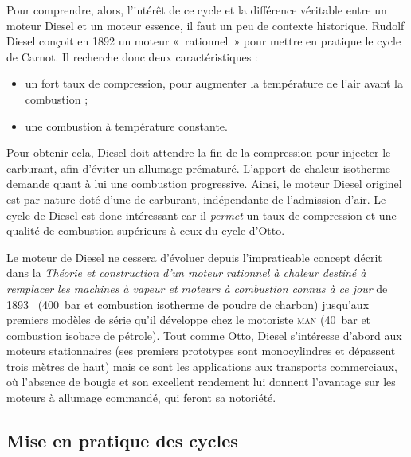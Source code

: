 		Pour comprendre, alors, l’intérêt de ce cycle et la différence véritable entre un moteur Diesel et un moteur essence, il faut un peu de contexte historique. Rudolf Diesel conçoit en 1892 un moteur «~rationnel~» pour mettre en pratique le cycle de Carnot. Il recherche donc deux caractéristiques :
		\begin{itemize}
			\item un fort taux de compression, pour augmenter la température de l’air avant la combustion ;
			\item une combustion à température constante.
		\end{itemize}
		Pour obtenir cela, Diesel doit attendre la fin de la compression pour injecter le carburant, afin d’éviter un allumage prématuré. L’apport de chaleur isotherme demande quant à lui une combustion progressive. Ainsi, le moteur Diesel originel est par nature doté d’une  de carburant, indépendante de l’admission d’air. Le cycle de Diesel est donc intéressant car il \emph{permet} un taux de compression et une qualité de combustion supérieurs à ceux du cycle d’Otto.
		
		Le moteur de Diesel ne cessera d’évoluer depuis l’impraticable concept décrit dans la \textit{Théorie et construction d’un moteur rationnel à chaleur destiné à remplacer les machines à vapeur et moteurs à combustion connus à ce jour} de 1893~\cite{diesel1893,diesel1893en} (\SI{400}{\bar} et combustion isotherme de poudre de charbon) jusqu’aux premiers modèles de série qu’il développe chez le motoriste \textsc{man} (\SI{40}{\bar} et combustion isobare de pétrole). Tout comme Otto, Diesel s’intéresse d’abord aux moteurs stationnaires (ses premiers prototypes sont monocylindres et dépassent trois mètres de haut) mais ce sont les applications aux transports commerciaux, où l’absence de bougie et son excellent rendement lui donnent l’avantage sur les moteurs à allumage commandé, qui feront sa notoriété.

	\subsection{Mise en pratique des cycles}
	\label{ch_cycles_pistons_reels}

